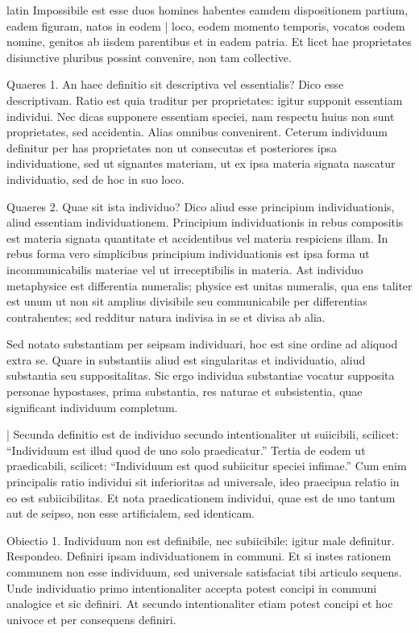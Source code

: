 \begin{otherlanguage*}{latin}
\pstart
Impossibile est esse duos homines habentes eamdem dispositionem partium, eadem figuram, natos in eodem \textnormal{|} loco, eodem momento temporis, vocatos eodem nomine, genitos ab iisdem parentibus et in eadem patria. Et licet hae proprietates disiunctive pluribus possint convenire, non tam collective. 
\pend

\pstart
Quaeres 1. An haec definitio sit descriptiva vel essentialis? Dico esse descriptivam. Ratio est quia traditur per proprietates:
igitur supponit essentiam individui. Nec dicas supponere essentiam speciei, nam respectu huius non sunt proprietates, sed accidentia. Alias omnibus convenirent. Ceterum individuum definitur per has proprietates non ut consecutas et posteriores ipsa individuatione, sed ut signantes materiam, ut ex ipsa materia signata nascatur individuatio, sed de hoc in suo loco. 
\pend

\pstart
Quaeres 2. Quae sit ista individuo? Dico aliud esse principium individuationis, aliud essentiam individuationem. Principium individuationis in rebus compositis est materia signata quantitate et accidentibus vel materia respiciens illam. In rebus forma vero simplicibus principium individuationis est ipsa forma ut incommunicabilis materiae vel ut irreceptibilis in materia. Ast individuo metaphysice est differentia numeralis; physice est unitas numeralis, qua ens taliter est unum ut non sit amplius divisibile seu communicabile per differentias contrahentes; sed redditur natura indivisa in se et divisa ab alia. 
\pend

\pstart
Sed notato substantiam per seipsam individuari, hoc est sine ordine ad aliquod extra se. Quare in substantiis aliud est singularitas et individuatio, aliud substantia seu suppositalitas. Sic ergo individua substantiae vocatur supposita personae hypostases, prima substantia, res naturae et subsistentia, quae significant individuum completum. 
\pend

\pstart
\textnormal{|} Secunda definitio est de individuo secundo intentionaliter ut suiicibili, scilicet:
\enquote{Individuum est illud quod de uno solo praedicatur.} Tertia de eodem ut praedicabili, scilicet:
\enquote{Individuum est quod subiicitur speciei infimae.} Cum enim principalis ratio individui sit inferioritas ad universale, ideo praecipua relatio in eo est subiicibilitas. Et nota praedicationem individui, quae est de uno tantum aut de seipso, non esse artificialem, sed identicam. 
\pend

\pstart
Obiectio 1. Individuum non est definibile, nec subiicibile:
igitur male definitur. Respondeo. Definiri ipsam individuationem in communi. Et si instes rationem communem non esse individuum, sed universale satisfaciat tibi articulo sequens. Unde individuatio primo intentionaliter accepta potest concipi in communi analogice et sic definiri. At secundo intentionaliter etiam potest concipi et hoc univoce et per consequens definiri. 
\pend


\end{otherlanguage*}
